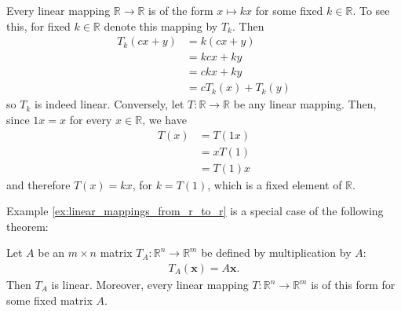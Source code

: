 \documentclass[12pt,letterpaper,reqno]{article}
\numberwithin{equation}{section}
\begin{document}
\begin{example}\label{ex:linear_mappings_from_r_to_r}
Every linear mapping $\mathbb{R}\to \mathbb{R}$ is of the form $x \mapsto kx$ for some fixed $k \in \mathbb{R}$. To see this, for fixed $k \in \mathbb{R}$ denote this mapping by $T_k$. Then
\begin{align*}
	T_k(cx+y)&=k(cx+y) \\
	&=kcx+ky \\
	&=ckx+ky \\
	&=cT_k(x)+T_k(y)
\end{align*}
so $T_k$ is indeed linear. Conversely, let $T:\mathbb{R} \to \mathbb{R}$ be any linear mapping. Then, since $1x=x$ for every $x \in \mathbb{R}$, we have
\begin{align*}
	T(x)&=T(1x) \\
	&=xT(1) \\
	&=T(1)x
\end{align*}
and therefore $T(x)=kx$, for $k=T(1)$, which is a fixed element of $\mathbb{R}$.
\end{example}


Example \ref{ex:linear_mappings_from_r_to_r} is a special case of the following theorem:

\begin{thm}\label{thm:matrix_of_a_linear_mapping}
Let $A$ be an $m \times n$ matrix $T_A:\mathbb{R}^n \to \mathbb{R}^m$ be defined by multiplication by $A$:
\begin{align*}
	T_A(\mathbf{x})=A\mathbf{x}.
\end{align*}	
Then $T_A$ is linear. Moreover, every linear mapping $T:\mathbb{R}^n \to \mathbb{R}^m$ is of this form for some fixed matrix $A$.
\end{thm}
\end{document}
